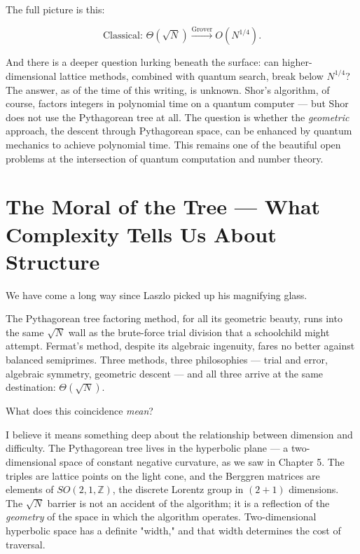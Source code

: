 \documentclass[11pt,twoside,openright]{book}
\theoremstyle{definition}
\theoremstyle{remark}
\begin{document}
The full picture is this:

\[\text{Classical: } \Theta(\sqrt{N}) \xrightarrow{\text{Grover}} O(N^{1/4}).\]

And there is a deeper question lurking beneath the surface: can higher-dimensional lattice methods, combined with quantum search, break below $N^{1/4}$? The answer, as of the time of this writing, is unknown. Shor's algorithm, of course, factors integers in polynomial time on a quantum computer --- but Shor does not use the Pythagorean tree at all. The question is whether the \textit{geometric} approach, the descent through Pythagorean space, can be enhanced by quantum mechanics to achieve polynomial time. This remains one of the beautiful open problems at the intersection of quantum computation and number theory.



\section{The Moral of the Tree --- What Complexity Tells Us About Structure}

We have come a long way since Laszlo picked up his magnifying glass.

The Pythagorean tree factoring method, for all its geometric beauty, runs into the same $\sqrt{N}$ wall as the brute-force trial division that a schoolchild might attempt. Fermat's method, despite its algebraic ingenuity, fares no better against balanced semiprimes. Three methods, three philosophies --- trial and error, algebraic symmetry, geometric descent --- and all three arrive at the same destination: $\Theta(\sqrt{N})$.

What does this coincidence \textit{mean}?

I believe it means something deep about the relationship between dimension and difficulty. The Pythagorean tree lives in the hyperbolic plane --- a two-dimensional space of constant negative curvature, as we saw in Chapter 5. The triples are lattice points on the light cone, and the Berggren matrices are elements of $SO(2, 1, \mathbb{Z})$, the discrete Lorentz group in $(2+1)$ dimensions. The $\sqrt{N}$ barrier is not an accident of the algorithm; it is a reflection of the \textit{geometry} of the space in which the algorithm operates. Two-dimensional hyperbolic space has a definite "width," and that width determines the cost of traversal.
\end{document}
